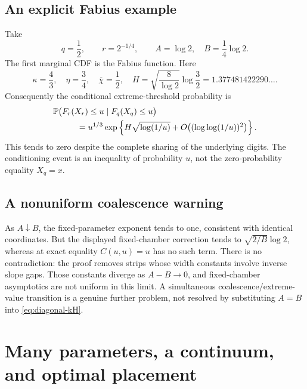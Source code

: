 \documentclass[11pt,a4paper]{article}
\theoremstyle{definition}
\theoremstyle{remark}
\newcommand{\PP}{\mathbb P}
\numberwithin{equation}{section}
\begin{document}
\subsection{An explicit Fabius example}
Take
\[
 q=\frac12,\qquad r=2^{-1/4},\qquad
 A=\log2,\quad B=\frac14\log2.
\]
The first marginal CDF is the Fabius function. Here
\begin{equation}
 \kappa=\frac43,\quad \eta=\frac34,\quad
 \overline\chi=\frac12,\quad
 H=\sqrt{\frac8{\log2}}\log\frac32
   =1.377481422290\ldots.
 \label{eq:fabius-example}
\end{equation}
Consequently the conditional extreme-threshold probability is
\begin{equation}
 \begin{split}
 &\PP\bigl(F_r(X_r)\le u\mid F_q(X_q)\le u\bigr)\\
 &\hspace{10mm}=
 u^{1/3}\exp\left\{H\sqrt{\log(1/u)}
       +O\bigl((\log\log(1/u))^2\bigr)\right\}.
 \end{split}
 \label{eq:conditional-threshold}
\end{equation}
This tends to zero despite the complete sharing of the underlying digits.
The conditioning event is an inequality of probability $u$, not the
zero-probability equality $X_q=x$.

\subsection{A nonuniform coalescence warning}
As $A\downarrow B$, the fixed-parameter exponent tends to one, consistent
with identical coordinates. But the displayed fixed-chamber correction
tends to $\sqrt{2/B}\log2$, whereas at exact equality $C(u,u)=u$ has no
such term. There is no contradiction: the proof removes strips whose
width constants involve inverse slope gaps. Those constants diverge as
$A-B\to0$, and fixed-chamber asymptotics are not uniform in this limit.
A simultaneous coalescence/extreme-value transition is a genuine further
problem, not resolved by substituting $A=B$ into \eqref{eq:diagonal-kH}.

\section{Many parameters, a continuum, and optimal placement}
\label{sec:continuum}
\end{document}
